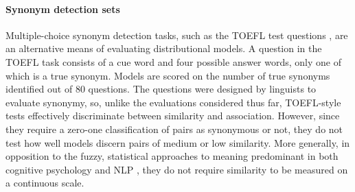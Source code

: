 \documentclass[fullname]{clv2}
\begin{document}
\paragraph{\bf Synonym detection sets} Multiple-choice synonym detection tasks, such as the TOEFL test questions \cite{landauer1997solution}, are an alternative means of evaluating distributional models. A question in the TOEFL task consists of a cue word and four possible answer words, only one of which is a true synonym. Models are scored on the number of true synonyms identified out of 80 questions. The questions were designed by linguists to evaluate synonymy, so, unlike the evaluations considered thus far, TOEFL-style tests effectively discriminate between similarity and association. However, since they require a zero-one classification of pairs as synonymous or not, they do not test how well models discern pairs of medium or low similarity. More generally, in opposition to the  fuzzy, statistical approaches to meaning predominant in both cognitive psychology \cite{griffiths2007topics} and NLP \cite{turney2010frequency}, they do not require similarity to be measured on a continuous scale.

\end{document}
